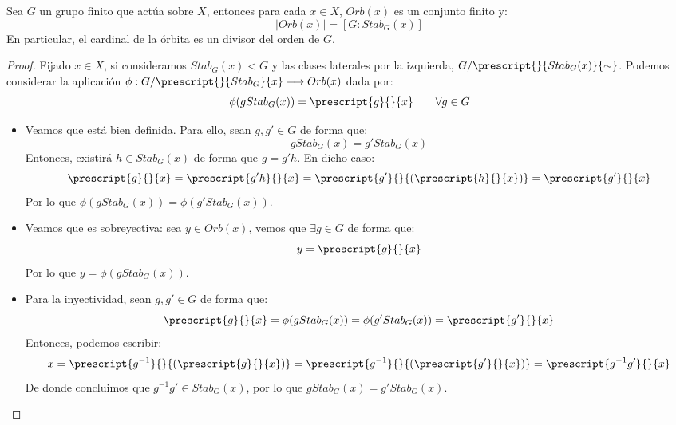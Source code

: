\begin{prop}
   Sea $G$ un grupo finito que actúa sobre $X$, entonces para cada $x\in X$, $Orb(x)$ es un conjunto finito y:
   \begin{equation*}
       |Orb(x)| = [G:Stab_G(x)]
   \end{equation*}
   En particular, el cardinal de la órbita es un divisor del orden de $G$.
   \begin{proof}
       Fijado $x\in X$, si consideramos $Stab_G(x) < G$ y las clases laterales por la izquierda, $G/\prescript{}{Stab_G(x)}{\sim}$. Podemos considerar la aplicación $\phi:G/\prescript{}{Stab_G}{x}\longrightarrow Orb(x)$ dada por:
       \begin{equation*}
           \phi(gStab_G(x)) = \prescript{g}{}{x} \qquad \forall g\in G
       \end{equation*}
       \begin{itemize}
           \item Veamos que está bien definida. Para ello, sean $g,g' \in G$ de forma que:
               \begin{equation*}
                   gStab_G(x) = g'Stab_G(x)
               \end{equation*}
               Entonces, existirá $h\in Stab_G(x)$ de forma que $g = g'h$. En dicho caso:
               \begin{equation*}
                   \prescript{g}{}{x} = \prescript{g'h}{}{x} = \prescript{g'}{}{(\prescript{h}{}{x})} = \prescript{g'}{}{x}
               \end{equation*}
               Por lo que $\phi(gStab_G(x)) = \phi(g'Stab_G(x))$.
           \item Veamos que es sobreyectiva: sea $y\in Orb(x)$, vemos que $\exists g\in G$ de forma que:
               \begin{equation*}
                   y = \prescript{g}{}{x}
               \end{equation*}
               Por lo que $y = \phi(gStab_G(x))$.
           \item Para la inyectividad, sean $g,g'\in G$ de forma que:
               \begin{equation*}
                   \prescript{g}{}{x} = \phi(gStab_G(x)) = \phi(g'Stab_G(x)) = \prescript{g'}{}{x}
               \end{equation*}
               Entonces, podemos escribir:
               \begin{equation*}
                   x = \prescript{g^{-1}}{}{(\prescript{g}{}{x})} = \prescript{g^{-1}}{}{(\prescript{g'}{}{x})} = \prescript{g^{-1}g'}{}{x}
               \end{equation*}
               De donde concluimos que $g^{-1}g'\in Stab_G(x)$, por lo que $gStab_G(x) = g'Stab_G(x)$.
       \end{itemize}
   \end{proof}
\end{prop}

